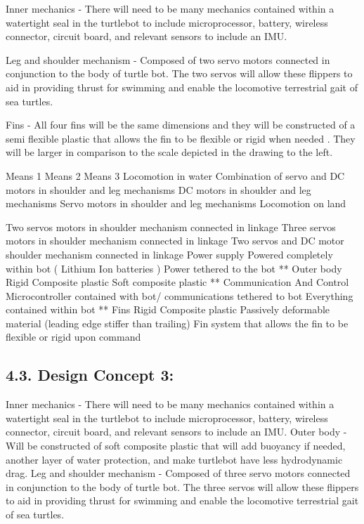 \documentclass[10pt]{article}
\begin{document}
Inner mechanics - There will need to be many mechanics contained within a watertight seal in the turtlebot to include microprocessor, battery, wireless connector, circuit board, and relevant sensors to include an IMU.

Leg and shoulder mechanism - Composed of two servo motors connected in conjunction to the body of turtle bot. The two servos will allow these flippers to aid in providing thrust for swimming and enable the locomotive terrestrial gait of sea turtles.  

Fins - All four fins will be the same dimensions and they will be constructed of a semi flexible plastic that allows the fin to be flexible or rigid when needed . They will be larger in comparison to the scale depicted in the drawing to the left. 


Means 1
Means 2
Means 3
Locomotion in water 
Combination of servo and DC motors in shoulder and leg mechanisms 
DC motors in shoulder and leg mechanisms
Servo motors in shoulder and leg mechanisms
Locomotion on land 

Two servos motors in shoulder mechanism connected in linkage 
Three servos motors in shoulder mechanism connected in linkage 
Two servos and DC motor shoulder mechanism connected in linkage 
Power supply 
Powered completely within bot ( Lithium Ion batteries )
Power tethered to the bot 
**
Outer body 
Rigid Composite plastic 
Soft composite plastic
**
Communication
 And Control
Microcontroller contained with bot/ communications tethered to bot
Everything contained within bot 
**
Fins 
Rigid Composite plastic
Passively deformable material (leading edge stiffer than trailing) 
Fin system that allows the fin to be flexible or rigid upon command 

\subsection{4.3. Design Concept 3:}
Inner mechanics - There will need to be many mechanics contained within a watertight seal in the turtlebot to include microprocessor, battery, wireless connector, circuit board, and relevant sensors to include an IMU.
Outer body - Will be constructed of soft composite plastic that will add buoyancy if needed, another layer of water protection, and make turtlebot have less hydrodynamic drag. 
Leg and shoulder mechanism - Composed of three servo motors connected in conjunction to the body of turtle bot. The three servos will allow these flippers to aid in providing thrust for swimming and enable the locomotive terrestrial gait of sea turtles.
\end{document}
